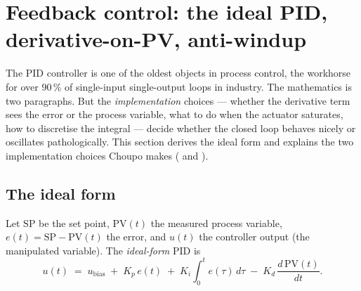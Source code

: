 \documentclass[11pt,a4paper]{article}
\begin{document}
\section{Feedback control: the ideal PID, derivative-on-PV, anti-windup}\label{ch:pid}

\begin{whatyoulllearn}
The PID controller is one of the oldest objects in process control,
the workhorse for over 90\,\% of single-input single-output loops in
industry.  The mathematics is two paragraphs.  But the
\emph{implementation} choices --- whether the derivative term sees
the error or the process variable, what to do when the actuator
saturates, how to discretise the integral --- decide whether the
closed loop behaves nicely or oscillates pathologically.  This
section derives the ideal form and explains the two
implementation choices Choupo makes ( and
).
\end{whatyoulllearn}

\subsection*{The ideal form}

Let $\mathrm{SP}$ be the set point, $\mathrm{PV}(t)$ the measured
process variable, $e(t) = \mathrm{SP} - \mathrm{PV}(t)$ the error,
and $u(t)$ the controller output (the manipulated variable). The
\emph{ideal-form} PID is
\begin{equation}
    u(t)
    \;=\; u_{\mathrm{bias}}
       \;+\; K_p\, e(t)
       \;+\; K_i \!\int_0^t \! e(\tau)\, d\tau
       \;-\; K_d \,\frac{d\,\mathrm{PV}(t)}{dt}.
    \label{eq:pid-ideal}
\end{equation}
\end{document}
